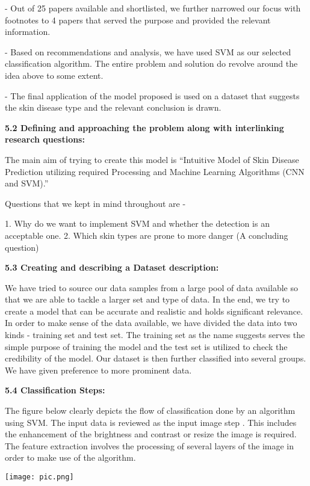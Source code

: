 \documentclass{article}
\begin{document}
- Out of 25 papers available and shortlisted, we further narrowed our focus with footnotes to 4 papers that served the purpose and provided the relevant information.

- Based on recommendations and analysis, we have used SVM as our selected classification algorithm. The entire problem and solution do revolve around the idea above to some extent.

- The final application of the model proposed is used on a dataset that suggests the skin disease type and the relevant conclusion is drawn.

\textbf{
5.2 Defining and approaching the problem along with interlinking research questions:
}

The main aim of trying to create this model is “Intuitive Model of Skin Disease Prediction utilizing required Processing and Machine Learning Algorithms (CNN and SVM).”

Questions that we kept in mind throughout are -

1. Why do we want to implement SVM and whether the detection is an acceptable one.
2. Which skin types are prone to more danger (A concluding question)

\textbf{5.3 Creating and describing a Dataset description:}

We have tried to source our data samples from a large pool of data available so that we are able to tackle a larger set and type of data.
In the end, we try to create a model that can be accurate and realistic and holds significant relevance. In order to make sense of the data available, we have divided the data into two kinds - training set and test set.
The training set as the name suggests serves the simple purpose of training the model and the test set is utilized to check the credibility of the model. Our dataset is then further classified into several groups. We have given preference to more prominent data.


\textbf{5.4 Classification Steps:}

The figure below clearly depicts the flow of classification done by an algorithm using SVM. The input data is reviewed as the input image step . This includes the enhancement of the brightness and contrast or resize the image is required. The feature extraction involves the processing of several layers of the image in order to make use of the algorithm.

\begin{center}
    \texttt{[image: pic.png]}
\end{center}
\end{document}

